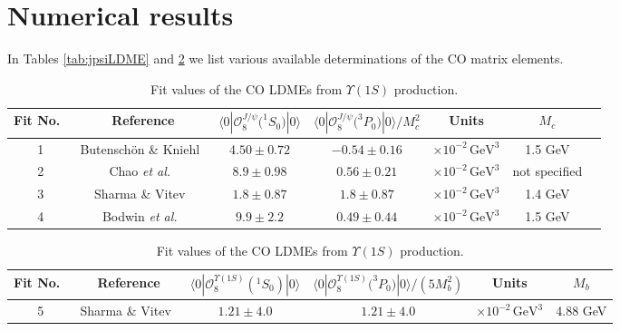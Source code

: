 \documentclass[prd,aps,preprintnumbers,nofootinbib,superscriptaddress]{revtex4}
\begin{document}
\section{Numerical results}\label{sec:numerics}
In Tables \ref{tab:jpsiLDME} and \ref{tab:uLDME} we list various available determinations of the CO matrix elements.
\begin{table}[t]
\begin{centering}
\begin{tabular}{|c|c|c|c|c|c|c|}
\hline 
Fit No.\ & Reference & $\langle0|\mathcal{O}_{8}^{J/\psi}\bigl(^{1}S_{0}\bigr)|0\rangle$ & $\langle0|\mathcal{O}_{8}^{J/\psi}\bigl(^{3}P_{0}\bigr)|0\rangle/M_c^2$ & Units & $M_c$\tabularnewline
\hline 
\hline 
1 & Butensch\"on \& Kniehl~\cite{Butenschoen:2010rq}
& $4.50 \pm 0.72$ & $-0.54 \pm 0.16$ & $\times10^{-2}\,\mathrm{GeV}^{3}\mathrm{}$& 1.5 GeV\tabularnewline
2 & Chao {\it et al.}~\cite{Chao:2012iv} 
& $8.9 \pm 0.98$ & $0.56 \pm 0.21$ & $\times10^{-2}\,\mathrm{GeV}^{3}\mathrm{}$ & {\rm not specified} \tabularnewline
3 & Sharma \& Vitev~\cite{Sharma:2012dy}& $1.8 \pm 0.87 $ & $1.8 \pm 0.87$ & $\times10^{-2}\,\mathrm{GeV}^{3}$ & 1.4 GeV \tabularnewline
4 & Bodwin {\it et al.}~\cite{Bodwin:2014gia}
& $9.9 \pm 2.2$ & $  0.49 \pm 0.44 $ & $\times10^{-2}\,\mathrm{GeV}^{3}\mathrm{}$& 1.5 GeV\tabularnewline
\hline
\end{tabular}
\par\end{centering}
\caption{Fit values of the CO LDMEs from $J/\psi$ production (with some corrections w.r.t.\ \cite{Bacchetta:2018ivt}).}
\label{tab:jpsiLDME}
\vspace{0.4cm}
%
\begin{centering}
\begin{tabular}{|c|c|c|c|c|c|}
\hline 
Fit No.\ & Reference & $\langle0|\mathcal{O}_{8}^{\Upsilon(1S)} (^{1}S_{0}  )|0\rangle$ & $\langle0|\mathcal{O}_{8}^{\Upsilon (1S )}\bigl(^{3}P_{0}\bigr)|0\rangle/(5M_b^2)$ & Units & $M_b$ \tabularnewline
\hline  
\hline 
5 & Sharma \& Vitev~\cite{Sharma:2012dy}& $1.21 \pm 4.0$ & $1.21 \pm 4.0$ & $\times10^{-2}\,\mathrm{GeV}^{3}$& 4.88 GeV\tabularnewline
\hline 
\end{tabular}
\par\end{centering}
\caption{Fit values of the CO LDMEs from $\Upsilon(1S)$ production.}
\label{tab:uLDME}
\end{table}
%
\end{document}
